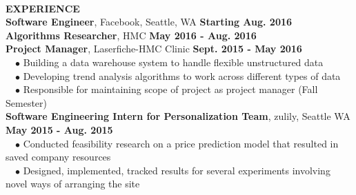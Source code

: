 \documentclass[11pt]{article}
\newcommand{\wrapTitle}[1]{{\sectionNL \textbf{\Large #1}} \sectionNL}
\newcommand{\sectionNL}{~\\[1pt]}
\newcommand{\customtab}{$\hspace{10pt} \bullet \hspace{2pt}$}
\newcommand{\HMC}{HMC}
\newcommand{\rightAlign}{\hfill}
\begin{document}
\begin{flushleft}
\wrapTitle{EXPERIENCE}
\textbf{Software Engineer}, Facebook, Seattle, WA \rightAlign \textbf{Starting Aug. 2016} \\
\textbf{Algorithms Researcher}, HMC \rightAlign \textbf{May 2016 - Aug. 2016} \\
\textbf{Project Manager}, Laserfiche-HMC Clinic \rightAlign \textbf{Sept. 2015 - May 2016} \\ 
\customtab Building a data warehouse system to handle flexible unstructured data \\
\customtab Developing trend analysis algorithms to work across different types of data \\
\customtab Responsible for maintaining scope of project as project manager (Fall Semester)\\
\textbf{Software Engineering Intern for Personalization Team}, zulily, Seattle WA \rightAlign \textbf{May 2015 - Aug. 2015} \\
\customtab Conducted feasibility research on a price prediction model that resulted in saved company resources \\
\customtab Designed, implemented, tracked results for several experiments involving novel ways of arranging the site \\

\end{flushleft}


\end{document}
